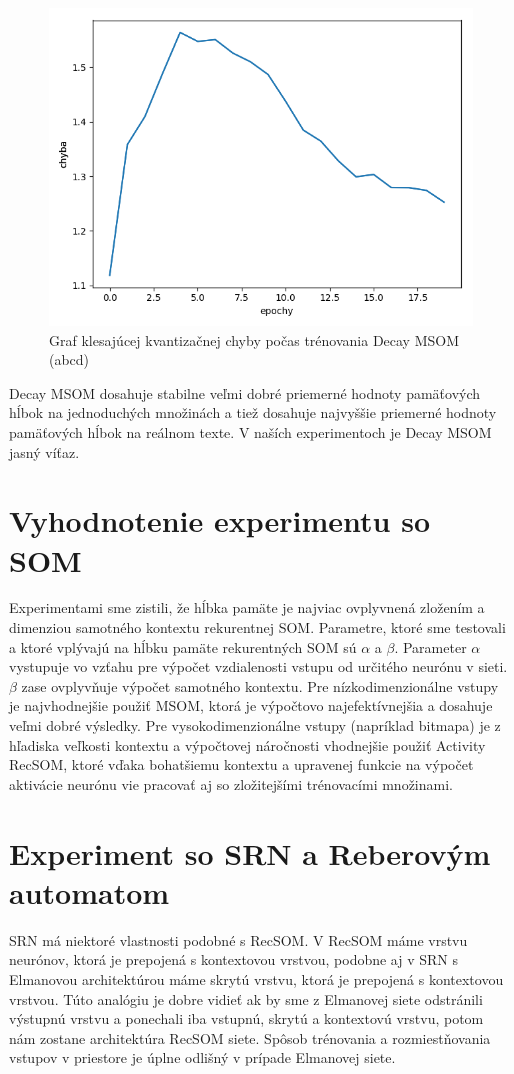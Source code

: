 \begin{figure}[H]
    \centering
    \includegraphics[width=\textwidth]{assets/dm_error_top}
    \caption{Graf klesajúcej kvantizačnej chyby počas trénovania Decay MSOM (abcd)}
\end{figure}

Decay MSOM dosahuje stabilne veľmi dobré priemerné hodnoty pamäťových hĺbok na jednoduchých množinách a 
tiež dosahuje najvyššie priemerné hodnoty pamäťových hĺbok na reálnom texte.
V naších experimentoch je Decay MSOM jasný víťaz.

\section{ Vyhodnotenie experimentu so SOM}
Experimentami sme zistili, že hĺbka pamäte je najviac ovplyvnená zložením a dimenziou samotného kontextu rekurentnej SOM.
Parametre, ktoré sme testovali a ktoré vplývajú na hĺbku pamäte rekurentných SOM sú $\alpha$ a $\beta$.
Parameter $\alpha$ vystupuje vo vzťahu pre výpočet vzdialenosti vstupu od určitého neurónu v sieti.
$\beta$ zase ovplyvňuje výpočet samotného kontextu.
Pre nízkodimenzionálne vstupy je najvhodnejšie použiť MSOM, ktorá je výpočtovo najefektívnejšia a dosahuje veľmi dobré 
výsledky.
Pre vysokodimenzionálne vstupy (napríklad bitmapa) je z hľadiska veľkosti kontextu a výpočtovej náročnosti vhodnejšie použiť
Activity RecSOM, ktoré vďaka bohatšiemu kontextu a upravenej funkcie na výpočet aktivácie neurónu vie pracovať aj so zložitejšími trénovacími množinami.


\section{Experiment so SRN a Reberovým automatom}
SRN má niektoré vlastnosti podobné s RecSOM.
V RecSOM máme vrstvu neurónov, ktorá je prepojená s kontextovou vrstvou, podobne 
aj v SRN s Elmanovou architektúrou máme skrytú vrstvu, ktorá je prepojená s kontextovou vrstvou.
Túto analógiu je dobre vidieť ak by sme z Elmanovej siete odstránili výstupnú vrstvu a ponechali iba 
vstupnú, skrytú a kontextovú vrstvu, potom nám zostane architektúra RecSOM siete.
Spôsob trénovania a rozmiestňovania vstupov v priestore je úplne odlišný v prípade Elmanovej siete.

